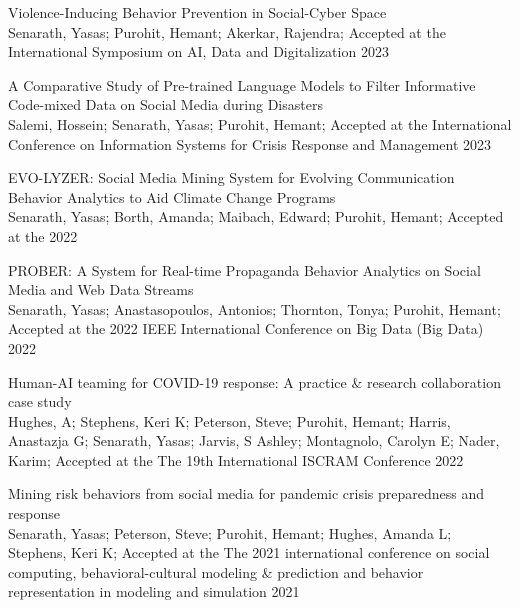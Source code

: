 \begin{rSubsection}{ Violence-Inducing Behavior Prevention in Social-Cyber Space }{\\ Senarath, Yasas; Purohit, Hemant; Akerkar, Rajendra; }{Accepted at the International Symposium on AI, Data and Digitalization}{ 2023 }
\end{rSubsection}

\begin{rSubsection}{ A Comparative Study of Pre-trained Language Models to Filter Informative Code-mixed Data on Social Media during Disasters }{\\ Salemi, Hossein; Senarath, Yasas; Purohit, Hemant; }{Accepted at the International Conference on Information Systems for Crisis Response and Management}{ 2023 }
\end{rSubsection}

\begin{rSubsection}{ EVO-LYZER: Social Media Mining System for Evolving Communication Behavior Analytics to Aid Climate Change Programs }{\\ Senarath, Yasas; Borth, Amanda; Maibach, Edward; Purohit, Hemant; }{Accepted at the }{ 2022 }
\end{rSubsection}

\begin{rSubsection}{ PROBER: A System for Real-time Propaganda Behavior Analytics on Social Media and Web Data Streams }{\\ Senarath, Yasas; Anastasopoulos, Antonios; Thornton, Tonya; Purohit, Hemant; }{Accepted at the 2022 IEEE International Conference on Big Data (Big Data)}{ 2022 }
\end{rSubsection}

\begin{rSubsection}{ Human-AI teaming for COVID-19 response: A practice & research collaboration case study }{\\ Hughes, A; Stephens, Keri K; Peterson, Steve; Purohit, Hemant; Harris, Anastazja G; Senarath, Yasas; Jarvis, S Ashley; Montagnolo, Carolyn E; Nader, Karim; }{Accepted at the The 19th International ISCRAM Conference}{ 2022 }
\end{rSubsection}

\begin{rSubsection}{ Mining risk behaviors from social media for pandemic crisis preparedness and response }{\\ Senarath, Yasas; Peterson, Steve; Purohit, Hemant; Hughes, Amanda L; Stephens, Keri K; }{Accepted at the The 2021 international conference on social computing, behavioral-cultural modeling & prediction and behavior representation in modeling and simulation}{ 2021 }
\end{rSubsection}

